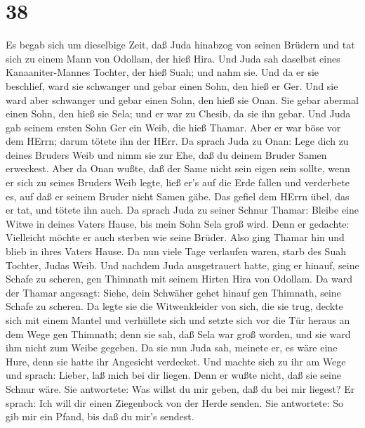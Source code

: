 \hypertarget{section-37}{%
\section{38}\label{section-37}}

 Es begab sich um dieselbige Zeit, daß Juda hinabzog von
seinen Brüdern und tat sich zu einem Mann von Odollam, der hieß Hira.
 Und Juda sah daselbst eines Kanaaniter-Mannes Tochter, der
hieß Suah; und nahm sie. Und da er sie beschlief,  ward sie
schwanger und gebar einen Sohn, den hieß er Ger.  Und sie
ward aber schwanger und gebar einen Sohn, den hieß sie Onan.
 Sie gebar abermal einen Sohn, den hieß sie Sela; und er war
zu Chesib, da sie ihn gebar.  Und Juda gab seinem ersten
Sohn Ger ein Weib, die hieß Thamar.  Aber er war böse vor
dem HErrn; darum tötete ihn der HErr.  Da sprach Juda zu
Onan: Lege dich zu deines Bruders Weib und nimm sie zur Ehe, daß du
deinem Bruder Samen erweckest.  Aber da Onan wußte, daß der
Same nicht sein eigen sein sollte, wenn er sich zu seines Bruders Weib
legte, ließ er's auf die Erde fallen und verderbete es, auf daß er
seinem Bruder nicht Samen gäbe.  Das gefiel dem HErrn übel,
das er tat, und tötete ihn auch.  Da sprach Juda zu seiner
Schnur Thamar: Bleibe eine Witwe in deines Vaters Hause, bis mein Sohn
Sela groß wird. Denn er gedachte: Vielleicht möchte er auch sterben wie
seine Brüder. Also ging Thamar hin und blieb in ihres Vaters Hause.
 Da nun viele Tage verlaufen waren, starb des Suah Tochter,
Judas Weib. Und nachdem Juda ausgetrauert hatte, ging er hinauf, seine
Schafe zu scheren, gen Thimnath mit seinem Hirten Hira von Odollam.
 Da ward der Thamar angesagt: Siehe, dein Schwäher gehet
hinauf gen Thimnath, seine Schafe zu scheren.  Da legte sie
die Witwenkleider von sich, die sie trug, deckte sich mit einem Mantel
und verhüllete sich und setzte sich vor die Tür heraus an dem Wege gen
Thimnath; denn sie sah, daß Sela war groß worden, und sie ward ihm nicht
zum Weibe gegeben.  Da sie nun Juda sah, meinete er, es
wäre eine Hure, denn sie hatte ihr Angesicht verdecket. 
Und machte sich zu ihr am Wege und sprach: Lieber, laß mich bei dir
liegen. Denn er wußte nicht, daß sie seine Schnur wäre. Sie antwortete:
Was willst du mir geben, daß du bei mir liegest?  Er
sprach: Ich will dir einen Ziegenbock von der Herde senden. Sie
antwortete: So gib mir ein Pfand, bis daß du mir's sendest.
